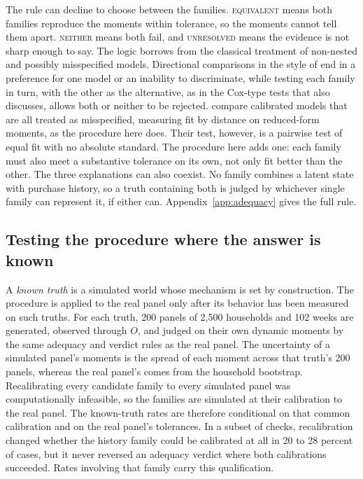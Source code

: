 \documentclass[11pt]{article}
\newcommand{\verdict}[1]{\textsc{#1}}
\begin{document}
\noindent The rule can decline to choose between the families. \verdict{equivalent} means both families reproduce the moments
within tolerance, so the moments cannot tell them apart. \verdict{neither} means both fail,
and \verdict{unresolved} means the evidence is not sharp enough to say. The logic borrows from
the classical treatment of non-nested and possibly misspecified models. Directional
comparisons in the style of \citet{vuong1989} end in a preference for one model or an
inability to discriminate, while testing each family in turn, with the other as the alternative, as in the Cox-type tests
that \citet{vuong1989} also discusses, allows both or neither to be rejected. \citet{hnatkovska2012} compare
calibrated models that are all treated as misspecified, measuring fit by distance on
reduced-form moments, as the procedure here does. Their test, however, is a pairwise test of
equal fit with no absolute standard. The procedure here adds one: each family must also meet
a substantive tolerance on its own, not only fit better than the other. The three
explanations can also coexist. No family combines a latent state with purchase history, so a
truth containing both is judged by whichever single family can represent it, if either can.
Appendix~\ref{app:adequacy} gives the full rule.

\subsection{Testing the procedure where the answer is known}

A \emph{known truth} is a simulated world whose mechanism is set by construction. The procedure
is applied to the real panel only after its behavior has been measured on such truths. For
each truth, 200 panels of 2,500 households and 102 weeks are generated, observed through $O$,
and judged on their own dynamic moments by the same adequacy and verdict rules as the real
panel. The uncertainty of a simulated panel's moments is the spread of each moment across that
truth's 200 panels, whereas the real panel's comes from the household bootstrap. Recalibrating
every candidate family to every simulated panel was computationally infeasible, so the
families are simulated at their calibration to the real panel. The known-truth rates are
therefore conditional on that common calibration and on the real panel's tolerances. In a
subset of checks, recalibration changed whether the history family could be calibrated at all
in 20 to 28 percent of cases, but it never reversed an adequacy verdict where both
calibrations succeeded. Rates involving that family carry this qualification.
\end{document}

